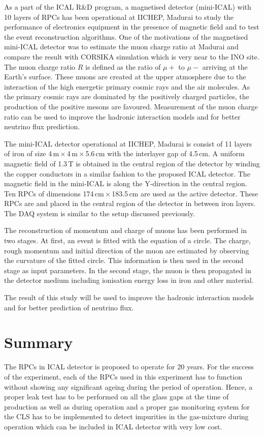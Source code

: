 \documentclass[a4paper,12pt,twoside,openany]{article}
\begin{document}
As a part of the ICAL R\&D program, a magnetised detector (mini-ICAL) with 10 layers of RPCs has been operational at IICHEP, Madurai to study the performance of electronics equipment in the presence of magnetic field and to test the event reconstruction algorithms. One of the motivations of the magnetised mini-ICAL detector was to estimate the muon charge ratio at Madurai and compare the result with CORSIKA simulation which is very near to the INO site. The muon charge ratio $R$ is defined as the ratio of $\mu+$ to $\mu-$ arriving at the Earth's surface. These muons are created at the upper atmosphere due to the interaction of the high energetic primary cosmic rays and the air molecules. As the primary cosmic rays are dominated by the positively charged particles, the production of the positive mesons are favoured. Measurement of the muon charge ratio can be used to improve the hadronic interaction models and for better neutrino flux prediction.

The mini-ICAL detector operational at IICHEP, Madurai is consist of 11 layers of iron of size 4\,m\,$\times$\,4\,m\,$\times$\,5.6\,cm with the interlayer gap of 4.5\,cm. A uniform magnetic field of 1.3\,T is obtained in the central region of the detector by winding the copper conductors in a similar fashion to the proposed ICAL detector. The magnetic field in the mini-ICAL is along the Y-direction in the central region. Ten RPCs of dimensions 174\,cm\,$\times$\,183.5\,cm are used as the active detector. These RPCs are and placed in the central region of the detector in between iron layers. The DAQ system is similar to the setup discussed previously.

The reconstruction of momentum and charge of muons has been performed in two stages. At first, an event is fitted with the equation of a circle. The charge, rough momentum and initial direction of the muon are estimated by observing the curvature of the fitted circle. This information is then used in the second stage as input parameters. In the second stage, the muon is then propagated in the detector medium including ionisation energy loss in iron and other material.

The result of this study will be used to improve the hadronic interaction models and for better prediction of neutrino flux.

\section{Summary}
The RPCs in ICAL detector is proposed to operate for 20 years. For the success of the experiment, each of the RPCs used in this experiment has to function without showing any significant ageing during the period of operation. Hence, a proper leak test has to be performed on all the glass gaps at the time of production as well as during operation and a proper gas monitoring system for the CLS has to be implemented to detect impurities in the gas-mixture during operation which can be included in ICAL detector with very low cost.
\end{document}
